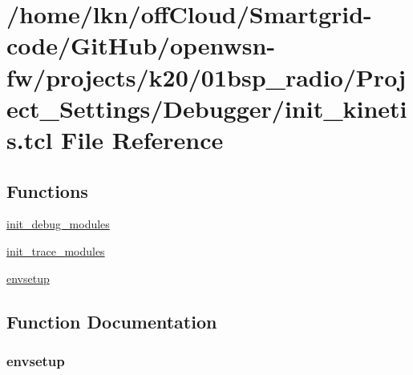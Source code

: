 \hypertarget{01bsp__radio_2_project___settings_2_debugger_2init__kinetis_8tcl}{}\section{/home/lkn/off\+Cloud/\+Smartgrid-\/code/\+Git\+Hub/openwsn-\/fw/projects/k20/01bsp\+\_\+radio/\+Project\+\_\+\+Settings/\+Debugger/init\+\_\+kinetis.tcl File Reference}
\label{01bsp__radio_2_project___settings_2_debugger_2init__kinetis_8tcl}
\subsection*{Functions}
\begin{DoxyCompactItemize}
\item 
\hyperlink{01bsp__radio_2_project___settings_2_debugger_2init__kinetis_8tcl_a10c80471835dee84e7652764cecbb722}{init\+\_\+debug\+\_\+modules}
\item 
\hyperlink{01bsp__radio_2_project___settings_2_debugger_2init__kinetis_8tcl_a8ecf61d10da6f21c5b31426f9a235e03}{init\+\_\+trace\+\_\+modules}
\item 
\hyperlink{01bsp__radio_2_project___settings_2_debugger_2init__kinetis_8tcl_a7f6b4cebda44b6e9d42cc7879ee95e8e}{envsetup}
\end{DoxyCompactItemize}


\subsection{Function Documentation}
\subsubsection[{\texorpdfstring{envsetup}{envsetup}}]{\setlength{\rightskip}{0pt plus 5cm}envsetup}\hypertarget{01bsp__radio_2_project___settings_2_debugger_2init__kinetis_8tcl_a7f6b4cebda44b6e9d42cc7879ee95e8e}{}\label{01bsp__radio_2_project___settings_2_debugger_2init__kinetis_8tcl_a7f6b4cebda44b6e9d42cc7879ee95e8e}


